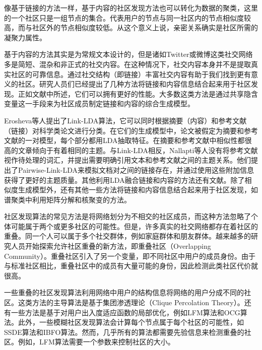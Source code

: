 像基于链接的方法一样，基于内容的社区发现方法也可以转化为数据的聚类，这里的一个社区只是一组节点的集合。代表用户的节点与同一社区内的节点相似度较高，而与社区外的节点相似度较低。从这个意义上说，亲密关系确实是社区所需的凝聚力属性。

基于内容的方法其实是为常规文本设计的，但是诸如Twitter或微博这类社交网络多是简短、混杂和非正式的社交内容。在这种情况下，社交内容本身并不是提取真实社区的可靠信息\cite{Yang2009Combining}。通过社交结构（即链接）丰富社交内容有助于我们找到更有意义的社区。研究人员们已经提出了几种方法将链接和内容信息结合起来用于社区发现。正如文献\cite{Cohn2001The,Getoor2003Learning}中所述，它们可以拥有更好的性能。大多数这类方法是通过共享隐含变量这一手段来为社区成员制定链接和内容的综合生成模型。

Erosheva等人\cite{Erosheva2004Mixed}提出了Link-LDA算法，它可以同时根据摘要（内容）和参考文献（链接）对科学类论文进行分类。在它们的生成模型中，论文被假定为摘要和参考文献的一对模型，每个部分都用LDA抽取特征。在摘要和参考文献中相似性都很高的文章倾向于有着相同的主题。与Link-LDA相反，Nallapti等人\cite{Nallapati2008Joint}没有将参考文献视作待处理的词汇，并提出需要明确引用文本和参考文献之间的主题关系。他们提出了Pairwise-Link-LDA来模拟文档对之间的链接存在，并通过使用这些附加信息获得了更好的主题质量。其他利用LDA融合链接和内容的方法还有文献\cite{Dietz2007Unsupervised,Gruber2008Latent}。除了相似度生成模型外，还有其他一些方法将链接和内容信息结合起来用于社区发现，如谱聚类中利用矩阵分解和核聚变的方法\cite{Zhu2007Combining,Yu2008Clustering}。

社区发现算法的常见方法是将网络划分为不相交的社区成员，而这种方法忽略了个体可能属于两个或更多社区的可能性。但是，许多真实的社交网络都存在着社区的重叠\cite{Xie2013Overlapping}。同一个人可以属于多个社交群体，例如家庭群体和朋友群体。越来越多的研究人员开始探索允许社区重叠的新方法，即重叠社区（Overlapping Community）。重叠社区引入了另一个变量，即不同社区中用户的成员身份。由于与标准社区相比，重叠社区中的成员有大量可能的身份，因此检测此类社区代价就很高。

一些重叠的社区发现算法利用网络中用户的结构信息将网络的用户分成不同的社区。这类方法的主导算法是基于集团渗透理论（Clique Percolation Theory）\cite{Palla2005Uncovering}。还有一些方法是基于对用户出入度适应函数的局部优化，例如LFM算法\cite{Lancichinetti2012Detecting}和OCG算法\cite{Becker2012Multifunctional}。此外，一些模糊社区发现算法会计算每个节点属于每个社区的可能性，如SSDE算法\cite{Magdon2010SSDE}和IBFO算法\cite{Lei2013Clustering}。然而，几乎所有的算法都需要先验信息来检测重叠的社区。例如，LFM算法需要一个参数来控制社区的大小。

